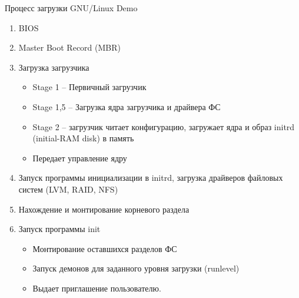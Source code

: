 \begin{frame}{Процесс загрузки GNU/Linux}
        Demo
        \pause
	\scriptsize
	\begin{enumerate}
		\item BIOS
		\item Master Boot Record (MBR)
			\pause
		\item Загрузка загрузчика 
		\begin{itemize}
		\footnotesize
			\item Stage 1 -- Первичный загрузчик
			\item Stage 1,5 -- Загрузка ядра загрузчика и драйвера ФС
			\item Stage 2 -- загрузчик читает конфигурацию, загружает ядра и образ initrd (initial-RAM disk) в память
                        \item Передает управление ядру
		\end{itemize}

		\item Запуск программы инициализации в initrd, загрузка драйверов файловых систем (LVM, RAID, NFS)
			\pause
		\item Нахождение и монтирование корневого раздела
			\pause
		\item Запуск программы init
		\begin{itemize}
		\footnotesize
			\item Монтирование оставшихся разделов ФС
			\item Запуск демонов для заданного уровня загрузки (runlevel)
			\item Выдает приглашение пользователю. 
		\end{itemize}

	\end{enumerate}
\end{frame}
